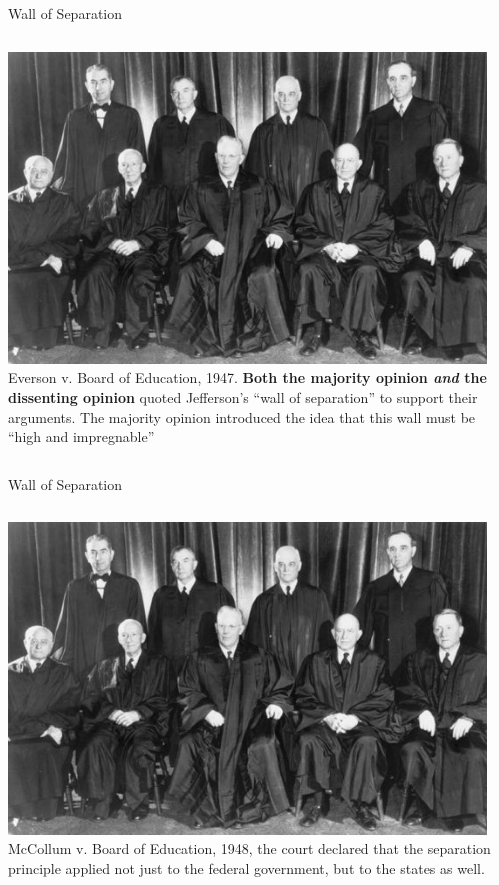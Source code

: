 \begin{frame}{Wall of Separation}
    \begin{columns}[onlytextwidth]
            \centering
            \includegraphics[width=0.95\textwidth]{img/supreme-court-1947.jpg} \\

            Everson v. Board of Education, 1947. \textbf{Both the majority
            opinion \textit{and} the dissenting opinion} quoted Jefferson's
            ``wall of separation'' to support their arguments.  The majority
            opinion introduced the idea that this wall must be ``high and
            impregnable''

    \end{columns}
\end{frame}

\begin{frame}{Wall of Separation}
    \begin{columns}[onlytextwidth]
            \centering
            \includegraphics[width=0.95\textwidth]{img/supreme-court-1947.jpg} \\

            McCollum v. Board of Education, 1948, the court declared that the
            separation principle applied not just to the federal government,
            but to the states as well.

    \end{columns}
\end{frame}

